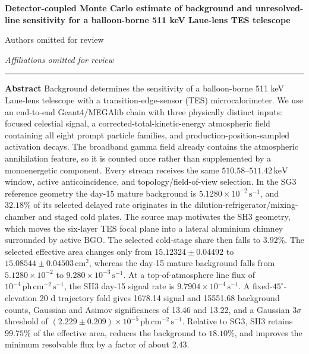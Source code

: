 \documentclass[11pt]{article}
\newcommand{\keV}{\ensuremath{\,\mathrm{keV}}}
\newcommand{\phcms}{\ensuremath{\,\mathrm{ph\,cm^{-2}\,s^{-1}}}}
\newcommand{\cps}{\ensuremath{\,\mathrm{s^{-1}}}}
\begin{document}
\thispagestyle{fancy}
\begin{flushleft}
{\LARGE\bfseries Detector-coupled Monte Carlo estimate of background and unresolved-line sensitivity for a balloon-borne 511 keV Laue-lens TES telescope\par}
\vspace{1.1em}
{\large Authors omitted for review\par}
\vspace{0.3em}
{\normalsize\itshape Affiliations omitted for review\par}
\end{flushleft}
\vspace{0.7em}
\noindent\rule{\textwidth}{0.4pt}
\vspace{0.5em}

\noindent\textbf{Abstract}\hspace{0.7em}
Background determines the sensitivity of a balloon-borne 511 keV Laue-lens
telescope with a transition-edge-sensor (TES) microcalorimeter. We use an
end-to-end Geant4/MEGAlib chain with three physically distinct inputs: focused
celestial signal, a corrected-total-kinetic-energy atmospheric field containing
all eight prompt particle families, and production-position-sampled activation
decays. The broadband gamma field already contains the atmospheric annihilation
feature, so it is counted once rather than supplemented by a monoenergetic
component. Every stream receives the same $510.58$--$511.42\keV$ window,
active anticoincidence, and topology/field-of-view selection. In the SG3
reference geometry the day-15 mature background is
$5.1280\times10^{-2}\cps$, and $32.18\%$ of its selected delayed rate originates
in the dilution-refrigerator/mixing-chamber and staged cold plates. The source
map motivates the SH3 geometry, which moves the six-layer TES focal plane into
a lateral aluminium chimney surrounded by active BGO. The selected cold-stage
share then falls to $3.92\%$. The selected effective area changes only from
$15.12324\pm0.04492$ to $15.08544\pm0.04503\,\mathrm{cm^2}$, whereas the
day-15 mature background falls from $5.1280\times10^{-2}$ to
$9.280\times10^{-3}\cps$. At a top-of-atmosphere line flux of
$10^{-4}\phcms$, the SH3 day-15 signal rate is
$9.7904\times10^{-4}\cps$. A fixed-$45^\circ$-elevation 20 d trajectory fold
gives 1678.14 signal and 15551.68 background counts, Gaussian and Asimov
significances of 13.46 and 13.22, and a Gaussian $3\sigma$ threshold of
$(2.229\pm0.209)\times10^{-5}\phcms$. Relative to SG3, SH3 retains $99.75\%$
of the effective area, reduces the background to $18.10\%$, and improves the
minimum resolvable flux by a factor of about 2.43.
\end{document}
